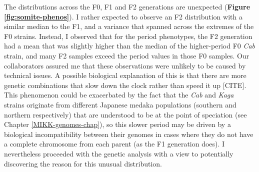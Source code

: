 \documentclass[
]{book}
\begin{document}
The distributions across the F0, F1 and F2 generations are unexpected (\textbf{Figure \ref{fig:somite-phenos}}). I rather expected to observe an F2 distribution with a similar median to the F1, and a variance that spanned across the extremes of the F0 strains. Instead, I observed that for the period phenotypes, the F2 generation had a mean that was slightly higher than the median of the higher-period F0 \emph{Cab} strain, and many F2 samples exceed the period values in those F0 samples. Our collaborators assured me that these observations were unlikely to be caused by technical issues. A possible biological explanation of this is that there are more genetic combinations that slow down the clock rather than speed it up {[}CITE{]}. This phenomenon could be exacerbated by the fact that the \emph{Cab} and \emph{Kaga} strains originate from different Japanese medaka populations (southern and northern respectively) that are understood to be at the point of speciation (see Chapter \ref{MIKK-genomes-chap}), so this slower period may be driven by a biological incompatibility between their genomes in cases where they do not have a complete chromosome from each parent (as the F1 generation does). I nevertheless proceeded with the genetic analysis with a view to potentially discovering the reason for this unusual distribution.
\end{document}

